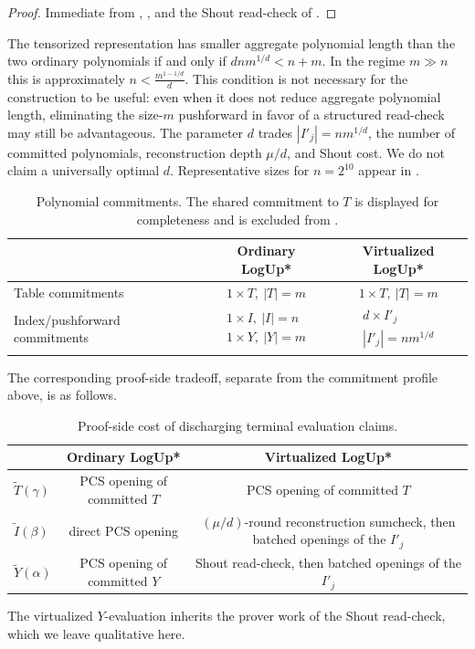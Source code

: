 \begin{proof}
Immediate from , , and the Shout read-check of .
\end{proof}

The tensorized representation has smaller aggregate polynomial length than the two ordinary polynomials if and only if
$dnm^{1/d}<n+m$.
In the regime $m\gg n$ this is approximately $n<\frac{m^{1-1/d}}{d}$.
This condition is not necessary for the construction to be useful:
even when it does not reduce aggregate polynomial length, eliminating the size-$m$ pushforward in favor of a structured read-check may still be advantageous.
The parameter $d$ trades $|I'_j|=nm^{1/d}$, the number of committed polynomials, reconstruction depth $\mu/d$, and Shout cost.
We do not claim a universally optimal $d$.
Representative sizes for $n=2^{10}$ appear in .

\begin{table}[!htbp]
\centering
\small
\begin{tabular}{@{}lcc@{}}
\toprule
& Ordinary LogUp* & Virtualized LogUp* \\
\midrule
Table commitments
& $1\times T,\ |T|=m$
& $1\times T,\ |T|=m$ \\
Index/pushforward commitments
&
$\begin{array}{c}
1\times I,\ |I|=n \\
1\times Y,\ |Y|=m
\end{array}$
&
$\begin{array}{c}
d\times I'_j \\
|I'_j|=nm^{1/d}
\end{array}$
\\
\bottomrule
\end{tabular}
\caption{Polynomial commitments.
The shared commitment to $T$ is displayed for completeness and is excluded from .}
\label{tab:commit-profile}
\end{table}

The corresponding proof-side tradeoff, separate from the commitment profile above, is as follows.

\begin{table}[!htbp]
\centering
\small
\begin{tabular}{@{}lcc@{}}
\toprule
& Ordinary LogUp* & Virtualized LogUp* \\
\midrule
$\widetilde{T}(\gamma)$
& PCS opening of committed $T$
& PCS opening of committed $T$ \\
$\widetilde{I}(\beta)$
& direct PCS opening
& $(\mu/d)$-round reconstruction sumcheck, then batched openings of the $I'_j$ \\
$\widetilde{Y}(\alpha)$
& PCS opening of committed $Y$
& Shout read-check, then batched openings of the $I'_j$ \\
\bottomrule
\end{tabular}
\caption{Proof-side cost of discharging terminal evaluation claims.}
\label{tab:proof-cost}
\end{table}

The virtualized $Y$-evaluation inherits the prover work of the Shout read-check, which we leave qualitative here.
